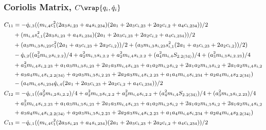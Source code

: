 	\subsubsection{Coriolis Matrix, $C\wrap{q_{i},\dot{q}_{i}}$}
	\label{sec::Coriolis_matrix}
	\vspace{-5mm}
	\begin{equation*}\small
		\begin{split} 
		C_{11} 	& = -\dot{q}_{i,3} ((m_{i,4} c_{1}^2 (2 a_{3} s_{i,23} + a_{4} s_{i,234}) (2 a_{1} + 2 a_{3} c_{i,23} + 2 a_{2} c_{i,2} + a_{4} c_{i,234}))/2\\ 
				& + (m_{i,4} s_{i,1}^2 (2 a_{3} s_{i,23} + a_{4} s_{i,234}) (2 a_{1} + 2 a_{3} c_{i,23} + 2 a_{2} c_{i,2} + a_{4} c_{i,234}))/2 \\
				& + (a_{3} m_{i,3} s_{i,23} c_{1}^2 (2 a_{1} + a_{3} c_{i,23} + 2 a_{2} c_{i,2}))/2 + (a_{3} m_{i,3} s_{i,23} s_{i,1}^2 (2 a_{1} + a_{3} c_{i,23} + 2 a_{2} c_{i,2}))/2) \\
				& - \dot{q}_{i,2} ((a_{2}^2 m_{i,2} s_{i,2.2})/4 + a_{2}^2 m_{i,3} s_{i,2.2} + a_{2}^2 m_{i,4} s_{i,2.2} + (a_{4}^2 m_{i,4} S_{2.2(34)})/4 + (a_{3}^2 m_{i,3} s_{i,2.23})/4 \\
				& + a_{3}^2 m_{i,4} s_{i,2.23} + a_{1} a_{3} m_{i,3} s_{i,23} + 2 a_{1} a_{3} m_{i,4} s_{i,23} + a_{1} a_{2} m_{i,2} s_{i,2} + 2 a_{1} a_{2} m_{i,3} s_{i,2} + 2 a_{1} a_{2} m_{i,4} s_{i,2} \\
				& + a_{3} a_{4} m_{i,4} s_{i,2.2(34)} + a_{2} a_{3} m_{i,3} s_{i,2.23} + 2 a_{2} a_{3} m_{i,4} s_{i,2.23} + a_{1} a_{4} m_{i,4} s_{i,234} + a_{2} a_{4} m_{i,4} s_{2.2(34)}) \\
				& - (a_{4} m_{i,4} s_{i,234} \dot{q}_{i,4} (2 a_{1} + 2 a_{3} c_{i,23} + 2 a_{2} c_{i,2} + a_{4} c_{i,234}))/2\\
	 	C_{12} 	& = -\dot{q}_{i,1} ((a_{2}^2 m_{i,2} s_{i,2.2})/4 + a_{2}^2 m_{i,3} s_{i,2.2} + a_{2}^2 m_{i,4} s_{i,2.2} + (a_{4}^2 m_{i,4} S_{2.2(34)})/4 + (a_{3}^2 m_{i,3} s_{i,2.23})/4 \\
	 			& + a_{3}^2 m_{i,4} s_{i,2.23} + a_{1} a_{3} m_{i,3} s_{i,23} + 2 a_{1} a_{3} m_{i,4} s_{i,23} + a_{1} a_{2} m_{i,2} s_{i,2} + 2 a_{1} a_{2} m_{i,3} s_{i,2} + 2 a_{1} a_{2} m_{i,4} s_{i,2} \\
	 			& + a_{3} a_{4} m_{i,4} s_{i,2.2(34)} + a_{2} a_{3} m_{i,3} s_{i,2.23} + 2 a_{2} a_{3} m_{i,4} s_{i,2.23} + a_{1} a_{4} m_{i,4} s_{i,234} + a_{2} a_{4} m_{i,4} s_{2.2(34)})\\
	 	C_{13} 	& = -\dot{q}_{i,1} ((m_{i,4} c_{1}^2 (2 a_{3} s_{i,23} + a_{4} s_{i,234}) (2 a_{1} + 2 a_{3} c_{i,23} + 2 a_{2} c_{i,2} + a_{4} c_{i,234}))/2 \\

\end{split}
\end{equation*}
